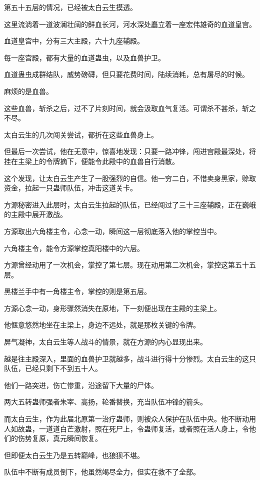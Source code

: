 \begin{this_body}
第五十五层的情况，已经被太白云生摸透。

这里流淌着一道波澜壮阔的鲜血长河，河水深处矗立着一座宏伟雄奇的血道皇宫。

血道皇宫中，分有三大主殿，六十九座辅殿。

每一座宫殿，都有大量的血道蛊虫，以及血兽护卫。

血道蛊虫成群结队，威势磅礴，但只要花费时间，陆续消耗，总有屠尽的时候。

麻烦的是血兽。

这些血兽，斩杀之后，过不了片刻时间，就会汲取血气复活。可谓杀不甚杀，斩之不尽。

太白云生的几次闯关尝试，都折在这些血兽身上。

但最后一次尝试，他在无意中，惊喜地发现：只要一路冲锋，闯进宫殿最深处，将挂在主梁上的令牌摘下，便能令此殿中的血兽自行消散。

这个发现，让太白云生产生了一股强烈的自信。他一穷二白，不惜卖身黑家，赊取资金，拉起一只蛊师队伍，冲击这道关卡。

方源秘密进入此层时，太白云生拉起的队伍，已经闯过了三十三座辅殿，正在巍峨的主殿中展开激战。

方源取出六角楼主令，心念一动，瞬间这一层彻底落入他的掌控当中。

六角楼主令，能令方源掌控真阳楼中的六层。

方源曾经动用了一次机会，掌控了第七层。现在动用第二次机会，掌控这第五十五层。

黑楼兰手中有一角楼主令，掌控的则是第五层。

方源心念一动，身形骤然消失在原地，下一刻便出现在主殿的主梁上。

他惬意悠然地坐在主梁上，身边不远处，就是那枚关键的令牌。

屏气凝神，太白云生等人战斗的情景，就在方源的内心显现出来。

越是往主殿深入，里面的血兽护卫就越多，战斗进行得十分惨烈。太白云生的这只队伍，已经只剩下不到五十人。

他们一路突进，伤亡惨重，沿途留下大量的尸体。

两大五转蛊师强者朱宰、高扬，轮番替换，充当队伍冲锋的箭头。

而太白云生，作为此届北原第一治疗蛊师，则被众人保护在队伍中央。他不断动用人如故蛊，一道道白芒激射，照在死尸上，令蛊师复活，或者照在活人身上，令他们的伤势复原，真元瞬间恢复。

但即便太白云生乃是五转巅峰，也狼狈不堪。

队伍中不断有成员倒下，他虽然竭尽全力，但实在救不了全部。


\end{this_body}
